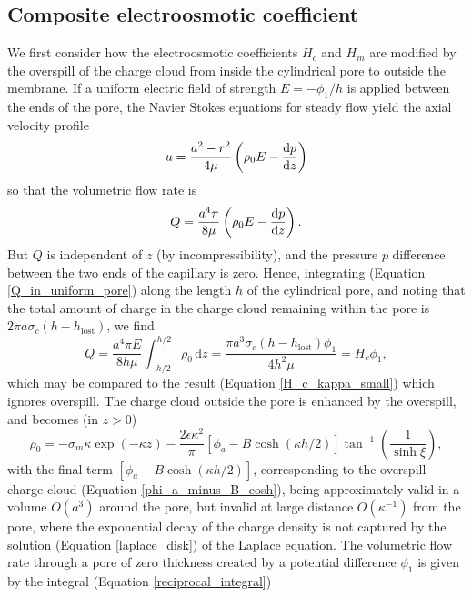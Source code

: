 \subsection{Composite electroosmotic coefficient}
We first consider how the electroosmotic coefficients $H_c$ and $H_m$
are modified by the overspill of the charge cloud from inside the
cylindrical pore to outside the membrane.
If a uniform electric field of
strength $E=-\phi_1/h$ is applied between the ends of the pore,
the Navier Stokes equations for steady flow yield the axial velocity profile
\begin{equation}
u=\frac{a^2-r^2}{4\mu}\left(\rho_0E-\frac{{\rm d}p}{{\rm d}z}\right)
\end{equation}
so that the volumetric flow rate is
\begin{equation}
Q=\frac{a^4\pi}{8\mu}\left(\rho_0E-\frac{{\rm d}p}{{\rm d}z}\right).
\label{Q_in_uniform_pore}
\end{equation}
But $Q$ is independent of $z$ (by incompressibility), and the pressure $p$
difference between the two ends of the capillary is zero. Hence, integrating
(Equation \ref{Q_in_uniform_pore}) along the length $h$ of the cylindrical pore,
and noting that
the total amount of charge in the charge cloud remaining within
the pore is
$2\pi a\sigma_c(h-h_\text{lost})$, we find
\begin{equation}
Q=\frac{a^4\pi E}{8h\mu}\int_{-h/2}^{h/2}\rho_0\,\text{d}z
=\frac{\pi a^3\sigma_c(h-h_\text{lost})\phi_1}{4h^2\mu}
=H_c\phi_1,
\label{H_c_underspill}
\end{equation}
which may be compared to the result (Equation \ref{H_c_kappa_small})
which ignores overspill.
The charge cloud outside the pore is enhanced by the overspill, and becomes
(in $z>0$)
\begin{equation}
\rho_0
=-\sigma_m\kappa\exp(-\kappa z)
-\frac{2\epsilon\kappa^2}{\pi}\left\lbrack\phi_a-B\cosh(\kappa h/2)\right\rbrack
\tan^{-1}\left(\frac{1}{\sinh\xi}\right),
\end{equation}
with the final term $[\phi_a-B\cosh(\kappa h/2)]$,
corresponding to the overspill charge cloud
(Equation \ref{phi_a_minus_B_cosh}), being
approximately valid in a volume $O(a^3)$ around the pore, but invalid at large
distance $O(\kappa^{-1})$ from the pore, where the exponential decay
of the charge density
is not captured by the solution (Equation \ref{laplace_disk}) of the Laplace equation.
The volumetric flow rate through a pore of zero thickness created by
a potential difference $\phi_1$
is given by the integral (Equation \ref{reciprocal_integral})
